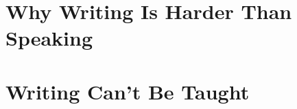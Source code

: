 \documentclass[11pt,oneside]{book}
\begin{document}
\part{Why Writing Is Harder Than Speaking}












\part{Writing Can't Be Taught}

\end{document}
